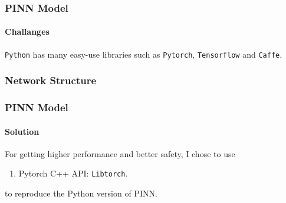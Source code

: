 \begin{frame}
  \frametitle{PINN Model}
  \framesubtitle{Challanges}
  \texttt{Python} has many easy-use libraries such as \texttt{Pytorch}, \texttt{Tensorflow} and \texttt{Caffe}.\\
\end{frame}


\subsubsection{Network Structure}
\begin{frame}
  \frametitle{PINN Model}
  \framesubtitle{Solution}
  For getting higher performance and better safety, I chose to use
  \begin{enumerate}
    \item Pytorch C++ API: \texttt{Libtorch}.
  \end{enumerate}
  to reproduce the Python version of PINN.


\end{frame}




